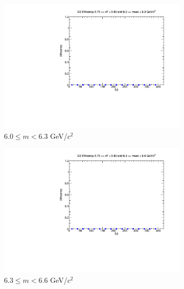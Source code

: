 \begin{figure}[p]
\begin{subfigure}[b]{0.32\textwidth}
        \includegraphics[width=\textwidth]{./kTrackerEfficiencyPlots/D2_Efficiency_xF15_mass6.pdf}
        \caption{$6.0 \leq m < 6.3$ GeV/$c^2$}
        \label{fig:xF15_mass6}
    \end{subfigure}
    \hfill
    \begin{subfigure}[b]{0.32\textwidth}
        \centering
        \includegraphics[width=\textwidth]{./kTrackerEfficiencyPlots/D2_Efficiency_xF15_mass7.pdf}
        \caption{$6.3 \leq m < 6.6$ GeV/$c^2$}
        \label{fig:xF15_mass7}
    \end{subfigure}
    \hfill
    \begin{subfigure}[b]{0.32\textwidth}
        \centering

\end{subfigure}
\end{figure}
